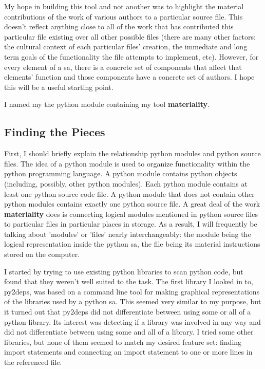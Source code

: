 \documentclass[a4paper,man,natbib,floatsintext]{apa6}
\begin{document}
  My hope in building this tool and not another was to highlight the material contributions of the work of various authors to a particular source file. This doesn't reflect anything close to all of the work that has contributed this particular file existing over all other possible files (there are many other factors: the cultural context of each particular files' creation, the immediate and long term goals of the functionality the file attempts to implement, etc). However, for every element of a \gls{sa}, there is a concrete set of components that affect that elements' function and those components have a concrete set of authors. I hope this will be a useful starting point.

  I named my the \Gls{python} module containing my tool \textbf{materiality}.

  \subsection{Finding the Pieces}
  First, I should briefly explain the relationship \Gls{python} modules and \Gls{python} source files. The idea of a \Gls{python} module is used to organize functionality within the \Gls{python} programming language. A \Gls{python} module contains \Gls{python} objects (including, possibly, other \Gls{python} modules). Each \Gls{python} module contains at least one \Gls{python} source code file. A \Gls{python} module that does not contain other \Gls{python} modules contains exactly one \Gls{python} source file. A great deal of the work \textbf{materiality} does is connecting logical modules mentioned in \Gls{python} source files to particular files in particular places in storage. As a result, I will frequently be talking about 'modules' or 'files' nearly interchangeably: the module being the logical representation inside the \Gls{python} \gls{sa}, the file being its material instructions stored on the computer.

  I started by trying to use existing \gls{python} libraries to scan \Gls{python} code, but found that they weren't well suited to the task. The first library I looked in to, py2deps, was based on a command line tool for making graphical representations of the libraries used by a \Gls{python} \gls{sa}. This seemed very similar to my purpose, but it turned out that py2deps did not differentiate between using some or all of a python library. Its interest was detecting if a library was involved in any way and did not differentiate between using some and all of a library. I tried some other libraries, but none of them seemed to match my desired feature set: finding import statements and connecting an import statement to one or more lines in the referenced file.
\end{document}
